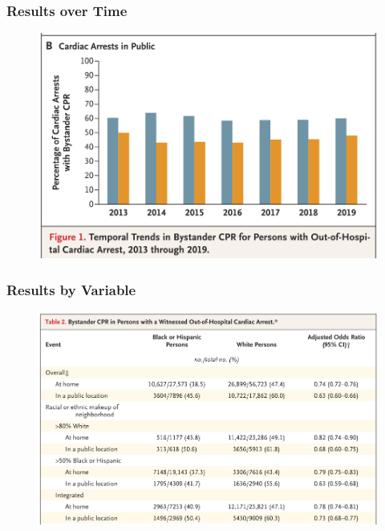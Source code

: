 \documentclass{beamer}
\begin{document}
		\begin{frame}
			\frametitle{Results over Time}
			\begin{figure}
				\centering
				\includegraphics[height=0.6\linewidth]{img/fig1-part2}
				\label{fig:fig1-part2}
			\end{figure}
		\end{frame}
		\begin{frame}
			\frametitle{Results by Variable}
			\pause
			\begin{figure}
				\centering
				\includegraphics[width=1.0\linewidth]{img/table2-part1.png}
				\label{fig:tab2-part1}
			\end{figure}
		\end{frame}
\end{document}
